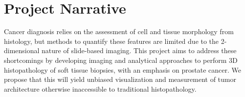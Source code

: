 \documentclass{NIHGrant}
\begin{document}
\part*{Project Narrative}
Cancer diagnosis relies on the assessment of cell and tissue morphology from histology, but methods to quantify these features are limited due to the 2-dimensional nature of slide-based imaging. This project aims to address these shortcomings by developing imaging and analytical approaches to perform 3D histopathology of soft tissue biopsies, with an emphasis on prostate cancer. We propose that this will yield unbiased visualization and measurement of tumor architecture otherwise inaccessible to traditional histopathology.

\newpage

\end{document}
